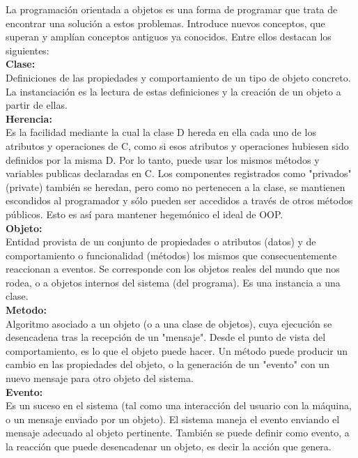 \begin{enumerate}[1.]
La programación orientada a objetos es una forma de programar que trata de encontrar una solución a estos problemas. Introduce nuevos conceptos, que superan y amplían conceptos antiguos ya conocidos. Entre ellos destacan los siguientes:\\

\textbf{Clase:}\\

Definiciones de las propiedades y comportamiento de un tipo de objeto concreto. La instanciación es la lectura de estas definiciones y la creación de un objeto a partir de ellas.\\

\textbf{Herencia:}\\

Es la facilidad mediante la cual la clase D hereda en ella cada uno de los atributos y operaciones de C, como si esos atributos y operaciones hubiesen sido definidos por la misma D. Por lo tanto, puede usar los mismos métodos y variables publicas declaradas en C. Los componentes registrados como "privados" (private) también se heredan, pero como no pertenecen a la clase, se mantienen escondidos al programador y sólo pueden ser accedidos a través de otros métodos públicos. Esto es así para mantener hegemónico el ideal de OOP.\\

\textbf{Objeto:}\\

Entidad provista de un conjunto de propiedades o atributos (datos) y de comportamiento o funcionalidad (métodos) los mismos que consecuentemente reaccionan a eventos. Se corresponde con los objetos reales del mundo que nos rodea, o a objetos internos del sistema (del programa). Es una instancia a una clase.\\


\textbf{Metodo:}\\

Algoritmo asociado a un objeto (o a una clase de objetos), cuya ejecución se desencadena tras la recepción de un "mensaje". Desde el punto de vista del comportamiento, es lo que el objeto puede hacer. Un método puede producir un cambio en las propiedades del objeto, o la generación de un "evento" con un nuevo mensaje para otro objeto del sistema.\\


\textbf{Evento:}\\

Es un suceso en el sistema (tal como una interacción del usuario con la máquina, o un mensaje enviado por un objeto). El sistema maneja el evento enviando el mensaje adecuado al objeto pertinente. También se puede definir como evento, a la reacción que puede desencadenar un objeto, es decir la acción que genera.\\



\end{enumerate}
